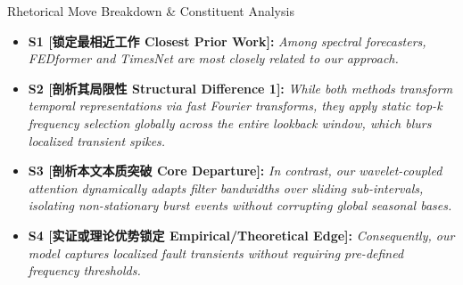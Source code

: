 \begin{TipBox}{Rhetorical Move Breakdown \& Constituent Analysis}
\begin{itemize}[leftmargin=1.5em]
  \item \textbf{S1 [锁定最相近工作 Closest Prior Work]:} \textit{Among spectral forecasters, FEDformer and TimesNet are most closely related to our approach.}\par{}
  \item \textbf{S2 [剖析其局限性 Structural Difference 1]:} \textit{While both methods transform temporal representations via fast Fourier transforms, they apply static top-k frequency selection globally across the entire lookback window, which blurs localized transient spikes.}\par{}
  \item \textbf{S3 [剖析本文本质突破 Core Departure]:} \textit{In contrast, our wavelet-coupled attention dynamically adapts filter bandwidths over sliding sub-intervals, isolating non-stationary burst events without corrupting global seasonal bases.}\par{}
  \item \textbf{S4 [实证或理论优势锁定 Empirical/Theoretical Edge]:} \textit{Consequently, our model captures localized fault transients without requiring pre-defined frequency thresholds.}\par{}
\end{itemize}
\end{TipBox}
\medskip
